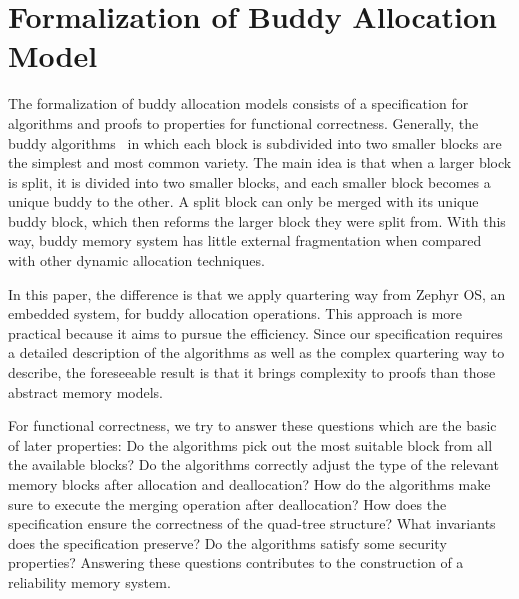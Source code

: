 \section{Formalization of Buddy Allocation Model}
The formalization of buddy allocation models consists of a specification for algorithms and proofs to properties for functional correctness. Generally, the buddy algorithms~\cite{reg_knowlton} in which each block is subdivided into two smaller blocks are the simplest and most common variety. The main idea is that when a larger block is split, it is divided into two smaller blocks, and each smaller block becomes a unique buddy to the other. A split block can only be merged with its unique buddy block, which then reforms the larger block they were split from. With this way, buddy memory system has little external fragmentation when compared with other dynamic allocation techniques.

In this paper, the difference is that we apply quartering way from Zephyr OS, an embedded system, for buddy allocation operations. This approach is more practical because it aims to pursue the efficiency. Since our specification requires a detailed description of the algorithms as well as the complex quartering way to describe, the foreseeable result is that it brings complexity to proofs than those abstract memory models. 

For functional correctness, we try to answer these questions which are the basic of later properties: Do the algorithms pick out the most suitable block from all the available blocks? Do the algorithms correctly adjust the type of the relevant memory blocks after allocation and deallocation? How do the algorithms make sure to execute the merging operation after deallocation? How does the specification ensure the correctness of the quad-tree structure? What invariants does the specification preserve? Do the algorithms satisfy some security properties? Answering these questions contributes to the construction of a reliability memory system.

